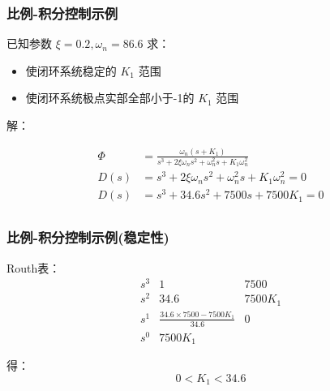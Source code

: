 \documentclass{beamer}
\begin{document}
\begin{frame}
\frametitle{比例-积分控制示例}
\label{sec-3-2}


已知参数 $\xi=0.2,\omega_n=86.6$ 求：
\begin{itemize}
\item 使闭环系统稳定的 $K_1$ 范围
\item 使闭环系统极点实部全部小于-1的 $K_1$ 范围
\end{itemize}

解：

\begin{align*}
\Phi &=\frac{\omega_n(s+K_1)}{s^3+2\xi\omega_n s^2+\omega_n^2s+K_1\omega_n^2} \\
D(s) &=s^3+2\xi\omega_n s^2+\omega_n^2s+K_1\omega_n^2=0\\
D(s) &=s^3+ 34.6 s^2 + 7500 s + 7500 K_1=0\\
\end{align*}
\end{frame}
\begin{frame}
\frametitle{比例-积分控制示例(稳定性)}
\label{sec-3-3}

Routh表：
\[
\begin{matrix}
s^3 & 1    & 7500 \\
s^2 & 34.6 & 7500K_1 \\
s^1 & \frac{34.6\times 7500-7500K_1}{34.6} & 0 \\
s^0 & 7500K_1 
\end{matrix}
\]

得：
\[
0<K_1<34.6
\]
\end{frame}
\end{document}
